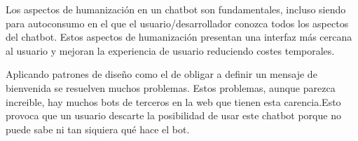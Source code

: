 Los aspectos de humanización en un chatbot son fundamentales, incluso siendo para autoconsumo en el que el usuario/desarrollador conozca todos los aspectos del chatbot. Estos aspectos de humanización presentan una interfaz más cercana al usuario y mejoran la experiencia de usuario reduciendo costes temporales.

Aplicando patrones de diseño como el de obligar a definir un mensaje de bienvenida se resuelven muchos problemas. Estos problemas, aunque parezca increible, hay muchos bots de terceros en la web que tienen esta carencia.Esto provoca que un usuario descarte la posibilidad de usar este chatbot porque no puede sabe ni tan siquiera qué hace el bot.
























